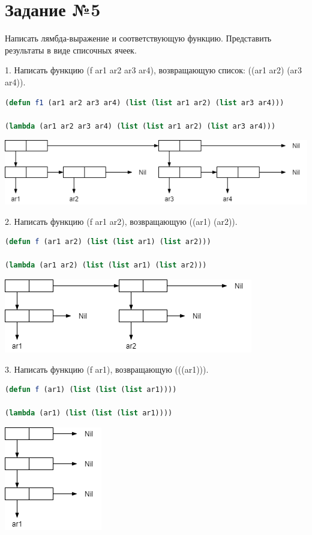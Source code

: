 \section{Задание №5}

Написать лямбда-выражение и соответствующую функцию. Представить результаты в виде списочных ячеек.

1. Написать функцию (f ar1 ar2 ar3 ar4), возвращающую список: ((ar1 ar2) (ar3 ar4)).
\begin{lstlisting}[language=Lisp]
(defun f1 (ar1 ar2 ar3 ar4) (list (list ar1 ar2) (list ar3 ar4)))

(lambda (ar1 ar2 ar3 ar4) (list (list ar1 ar2) (list ar3 ar4)))
\end{lstlisting}

\includegraphics[scale=0.8]{img/1}

2. Написать функцию (f ar1 ar2), возвращающую ((ar1) (ar2)).
\begin{lstlisting}[language=Lisp]
(defun f (ar1 ar2) (list (list ar1) (list ar2)))

(lambda (ar1 ar2) (list (list ar1) (list ar2)))
\end{lstlisting}

\includegraphics[scale=0.8]{img/2}

3. Написать функцию (f ar1), возвращающую (((ar1))).
\begin{lstlisting}[language=Lisp]
(defun f (ar1) (list (list (list ar1))))

(lambda (ar1) (list (list (list ar1))))
\end{lstlisting}

\includegraphics[scale=0.8]{img/3}


